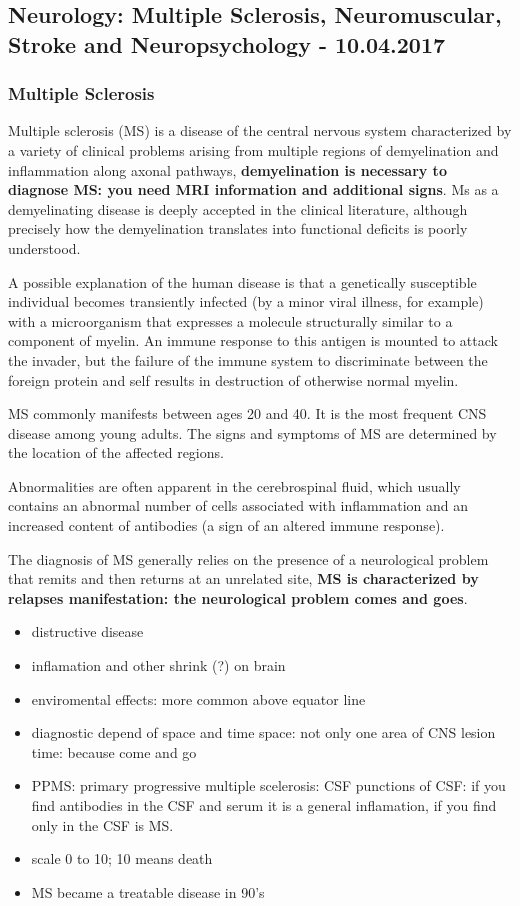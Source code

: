 \documentclass[12pt,article,oneside,a4paper]{memoir}
\begin{document}
\newpage
\subsection{Neurology: Multiple Sclerosis, Neuromuscular, Stroke and Neuropsychology - 10.04.2017}

\subsubsection{Multiple Sclerosis}

Multiple sclerosis (MS) is a disease of the central nervous system characterized by a variety of clinical problems arising from multiple regions of demyelination and inflammation along axonal pathways, \textbf{demyelination is necessary to diagnose MS: you need MRI information and additional signs}. Ms as a demyelinating disease is deeply accepted in the clinical literature, although precisely how the demyelination translates into functional deficits is poorly understood.

A possible explanation of the human disease is that a genetically susceptible individual becomes transiently infected (by a minor viral illness, for example) with a  microorganism that expresses a molecule structurally similar to a component of myelin.  An immune response to this antigen is mounted to attack the invader, but the failure of the immune system to discriminate between the foreign protein and self results in destruction of otherwise normal myelin.

MS commonly manifests between ages 20 and 40. It is the most frequent CNS disease among young adults.
The signs and symptoms of MS are determined by the location of the affected regions.

Abnormalities are often apparent in the cerebrospinal fluid, which usually contains an abnormal number of cells associated with inflammation and an increased content of antibodies (a sign of an altered immune response).

The diagnosis of MS generally relies on the presence of a neurological problem that remits and then returns at an unrelated site, \textbf{MS is characterized by relapses manifestation: the neurological problem comes and goes}.

\begin{itemize}
\item distructive disease
\item inflamation and other shrink (?) on brain
\item enviromental effects: more common above equator line
\item diagnostic depend of space and time
\subitem space: not only one area of CNS lesion
\subitem time: because come and go
\item PPMS: primary progressive multiple scelerosis: CSF
\subitem punctions of CSF: if you find antibodies in the CSF and serum it is a general inflamation, if you find only in the CSF is MS.
\item scale 0 to 10; 10 means death
\item MS became a treatable disease in 90's
\end{itemize}
\end{document}
